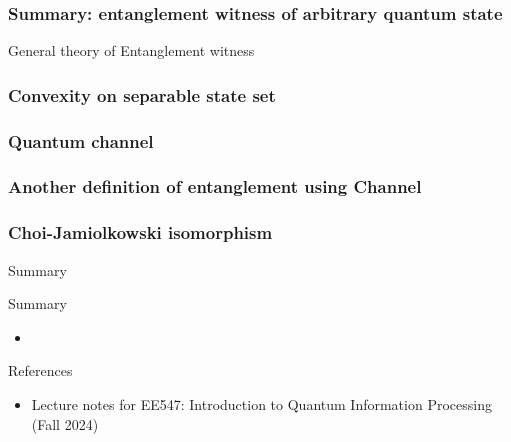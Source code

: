 \documentclass[9pt]{beamer}
\begin{document}
    \begin{frame}
        \frametitle{Summary: entanglement witness of arbitrary quantum state}
        
    \end{frame}

    \begin{section}{General theory of  Entanglement witness}
        \begin{frame}
            \frametitle{Convexity on separable state set}
            
        \end{frame}
        
        \begin{frame}
            \frametitle{Quantum channel}
            
        \end{frame}

        \begin{frame}
            \frametitle{Another definition of entanglement using Channel}
            
        \end{frame}

        \begin{frame}
            \frametitle{Choi-Jamiolkowski isomorphism}
            
        \end{frame}
    \end{section}

    \begin{frame}{Summary}
        \begin{block}{Summary}
            \begin{itemize}
                \item 
            \end{itemize}
        \end{block}
    \end{frame}


    \begin{frame}{References}
        \begin{itemize}
            \item Lecture notes for EE547: Introduction to Quantum Information Processing (Fall 2024)
        \end{itemize}
        \vspace{6cm}
    \end{frame}
\end{document}
